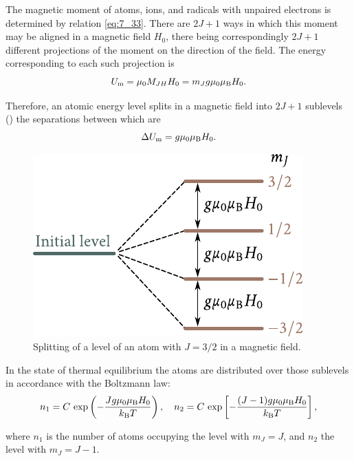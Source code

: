 The magnetic moment of atoms, ions, and radicals with unpaired electrons is determined by relation \eqref{eq:7_33}. There are $2J+1$ ways in which this moment may be aligned in a magnetic field $H_0$, there being correspondingly $2J+1$ different projections of the moment on the direction of the field. The energy corresponding to each such projection is
\begin{equation}\label{eq:7_73}
    U_{\text{m}} = \mu_0 M_{JH} H_0 = m_J g \mu_0 \mu_{\text{B}} H_0.
\end{equation}

\noindent
Therefore, an atomic energy level splits in a magnetic field into $2J+1$ sublevels () the separations between which are
\begin{equation}\label{eq:7_74}
    \Delta{U_{\text{m}}} = g \mu_0 \mu_{\text{B}} H_0.
\end{equation}

\begin{figure}[t]
	\begin{center}
		\includegraphics[scale=1]{figures/ch_07/fig_7_24.pdf}
		\caption[]{Splitting of a level of an atom with $J=3/2$ in a magnetic field.}
		\label{fig:7_24}
	\end{center}
	\vspace{-0.8cm}
\end{figure}

In the state of thermal equilibrium the atoms are distributed over those sublevels in accordance with the Boltzmann law:
\begin{equation*}
    n_1 = C\,\exp\left(-\frac{J g \mu_0 \mu_{\text{B}} H_0}{k_{\text{B}} T}\right),\quad n_2 = C\,\exp\left[-\frac{(J-1) g \mu_0 \mu_{\text{B}} H_0}{k_{\text{B}} T}\right],
\end{equation*}

\noindent
where $n_1$ is the number of atoms occupying the level with $m_J=J$, and $n_2$ the level with $m_J=J-1$.

